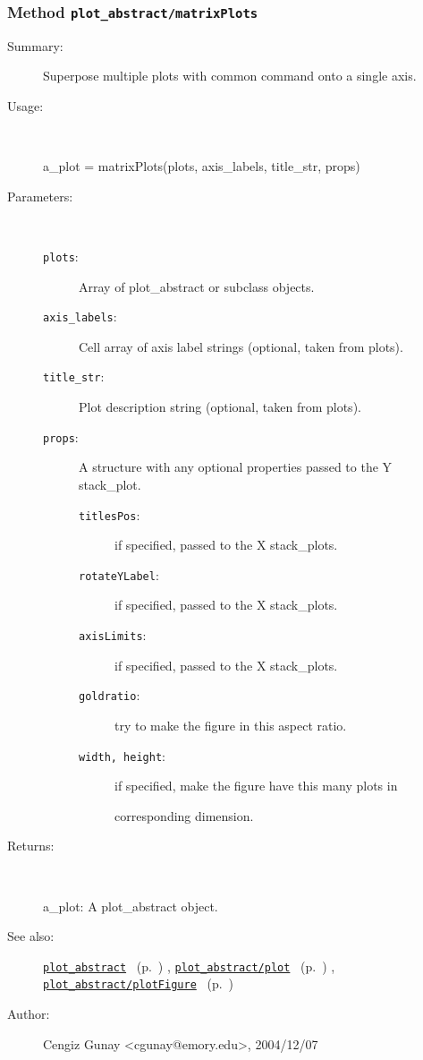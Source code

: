 \subsubsection[Method \texttt{matrixPlots}]{Method \texttt{plot\_abstract/matrixPlots}}%
%
\label{ref_plot_abstract__matrixPlots}%
\hypertarget{ref_plot_abstract__matrixPlots}{}%
\begin{description}
\item[Summary:]Superpose multiple plots with common command onto a single axis.
%
\item[Usage:]~%
\begin{lyxcode}%
a\_plot = matrixPlots(plots, axis\_labels, title\_str, props)
%
\end{lyxcode}%
%
%
\item[Parameters:]~
\begin{description}%
\item[\texttt{plots}:]
 Array of plot\_abstract or subclass objects.
\item[\texttt{axis\_labels}:]
 Cell array of axis label strings (optional, taken from plots).
\item[\texttt{title\_str}:]
 Plot description string (optional, taken from plots).
\item[\texttt{props}:]
 A structure with any optional properties passed to the Y stack\_plot.
\begin{description}%
\item[\texttt{titlesPos}:]
 if specified, passed to the X stack\_plots.
\item[\texttt{rotateYLabel}:]
 if specified, passed to the X stack\_plots.
\item[\texttt{axisLimits}:]
 if specified, passed to the X stack\_plots.
\item[\texttt{goldratio}:]
 try to make the figure in this aspect ratio.
\item[\texttt{width, height}:]
 if specified, make the figure have this many plots in 

corresponding dimension.\end{description}%
\end{description}%
%
\item[Returns:]~

	a\_plot: A plot\_abstract object.
%
%
\item[See also:]%
\hyperlink{ref_plot_abstract}{\texttt{plot\_abstract}}%
\ (p.~\pageref{ref_plot_abstract})%
%
, \hyperlink{ref_plot_abstract__plot}{\texttt{plot\_abstract/plot}}%
\ (p.~\pageref{ref_plot_abstract__plot})%
%
, \hyperlink{ref_plot_abstract__plotFigure}{\texttt{plot\_abstract/plotFigure}}%
\ (p.~\pageref{ref_plot_abstract__plotFigure})%
%
%
\item[Author:]%
Cengiz Gunay <cgunay@emory.edu>, 2004/12/07%
\end{description}
\methodline%
